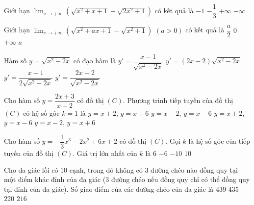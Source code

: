 \begin{ex}%
Giới hạn $\displaystyle\lim_{x\to +\infty}\left(\sqrt{x^2+x+1}-\sqrt{2x^2+1}\right)$ có kết quả là
\choice
{$-1$}
{$-\dfrac{1}{3}$}
{$+\infty$}
{\True $ -\infty$}
\end{ex}

\begin{ex}%
Giới hạn $\displaystyle\lim_{x\to +\infty}\left(\sqrt{x^2+ax+1}-\sqrt{x^2+1}\right)$ $(a>0)$ có kết quả là
\choice
{\True $\dfrac{a}{2}$}
{$0$}
{$+\infty$}
{$a$}
\end{ex}

\begin{ex}%
Hàm số $y=\sqrt{x^2-2x}$ có đạo hàm là
\choice
{\True $y'=\dfrac{x-1}{\sqrt{x^2-2x}}$}
{$y'=(2x-2)\sqrt{x^2-2x}$}
{$y'=\dfrac{x-1}{2\sqrt{x^2-2x}}$}
{$y'=\dfrac{2x-2}{\sqrt{x^2-2x}}$}
\end{ex}

\begin{ex}%
Cho hàm số $y=\dfrac{2x+3}{x+2}$ có đồ thị $(C)$. Phương trình tiếp tuyến của đồ thị $(C)$ có hệ số góc $k=1$ là
\choice
{\True $y=x+2$, $y=x+6$}
{$y=x-2$, $y=x-6$}
{$y=x+2$, $y=x-6$}
{$y=x-2$, $y=x+6$}
\end{ex}

\begin{ex}%
Cho hàm số $y=-\dfrac{1}{3}x^3-2x^2+6x+2$ có đồ thị $(C)$. Gọi $k$ là hệ số góc của tiếp tuyến của đồ thị $(C)$. Giá trị lớn nhất của $k$ là
\choice
{$6$}
{$-6$}
{$-10$}
{\True $10$}
\end{ex}

\begin{ex}%
Cho đa giác lồi có $10$ cạnh,  trong đó không có $3$ đường chéo nào đồng quy tại một điểm khác đỉnh của đa giác ($3$ đường chéo nếu đồng quy chỉ có thể đồng quy tại đỉnh của đa giác). Số giao điểm của các đường chéo của đa giác là
\choice
{$439$}
{$435$}
{\True $220$}
{$216$}
\end{ex}

